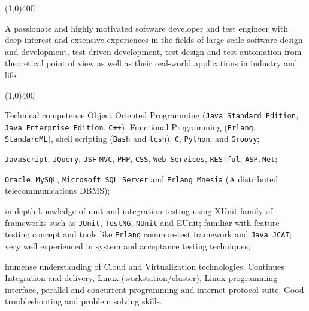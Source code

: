 \documentclass{resume}
\author{Amin Khorsandi}
\begin{document}
\maketitle

\begin{center}
\line(1,0){400}
\end{center}

\par \begin{flushleft}A passionate and highly motivated software developer 
and test engineer with deep interest and extensive experiences in the 
fields of large scale software design and development, test driven 
development, test design and test automation from theoretical point 
of view as well as their real-world applications in industry and life.
\end{flushleft}

\begin{center}
\line(1,0){400}
\end{center}

\begin{category}{Technical competence}
\hspace{1 mm}Object Oriented Programming 
(\texttt{Java Standard Edition}, \texttt{Java Enterprise Edition}, \texttt{C++}), 
Functional Programming (\texttt{Erlang}, \texttt{StandardML}), 
shell scripting (\texttt{Bash} and \texttt{tcsh}), \texttt{C}, \texttt{Python}, 
and \texttt{Groovy};

\hspace{1 mm}\texttt{JavaScript}, \texttt{JQuery}, \texttt{JSF} 
\texttt{MVC}, \texttt{PHP}, \texttt{CSS}, \texttt{Web Services}, \texttt{RESTful}, \texttt{ASP.Net};

\hspace{1 mm}\texttt{Oracle}, \texttt{MySQL}, \texttt{Microsoft SQL Server} 
and \texttt{Erlang Mnesia} (A distributed telecommunications DBMS);

\hspace{1 mm}in-depth knowledge of unit and integration 
testing using XUnit family of frameworks such as \texttt{JUnit}, \texttt{TestNG}, \texttt{NUnit} 
and EUnit; familiar with feature testing concept and tools like \texttt{Erlang} common-test 
framework and \texttt{Java JCAT}; very well experienced in system and acceptance testing techniques;

\hspace{1 mm}immense understanding of Cloud and Virtualization technologies, 
Continues Integration and delivery, Linux (workstation/cluster), Linux programming interface,
parallel and concurrent programming and internet protocol suite.
Good troubleshooting and problem solving skills.

\end{category}
\end{document}
